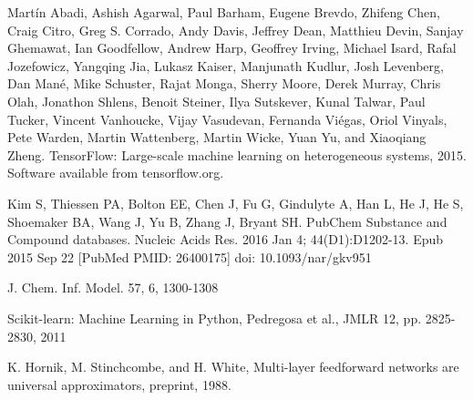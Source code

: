 \begin{thebibliography}{9}

		Martín Abadi, Ashish Agarwal, Paul Barham, Eugene Brevdo,
Zhifeng Chen, Craig Citro, Greg S. Corrado, Andy Davis,
Jeffrey Dean, Matthieu Devin, Sanjay Ghemawat, Ian Goodfellow,
Andrew Harp, Geoffrey Irving, Michael Isard, Rafal Jozefowicz, Yangqing Jia,
Lukasz Kaiser, Manjunath Kudlur, Josh Levenberg, Dan Mané, Mike Schuster,
Rajat Monga, Sherry Moore, Derek Murray, Chris Olah, Jonathon Shlens,
Benoit Steiner, Ilya Sutskever, Kunal Talwar, Paul Tucker,
Vincent Vanhoucke, Vijay Vasudevan, Fernanda Viégas,
Oriol Vinyals, Pete Warden, Martin Wattenberg, Martin Wicke,
Yuan Yu, and Xiaoqiang Zheng.
TensorFlow: Large-scale machine learning on heterogeneous systems,
2015. Software available from tensorflow.org.

		Kim S, Thiessen PA, Bolton EE, Chen J, Fu G, Gindulyte A, Han L, He J, He S, Shoemaker BA, Wang J, Yu B, Zhang J, Bryant SH. PubChem Substance and Compound databases. Nucleic Acids Res. 2016 Jan 4; 44(D1):D1202-13. Epub 2015 Sep 22 [PubMed PMID: 26400175] doi: 10.1093/nar/gkv951
		
		J. Chem. Inf. Model.  57, 6, 1300-1308

		Scikit-learn: Machine Learning in Python, Pedregosa et al., JMLR 12, pp. 2825-2830, 2011

		K. Hornik, M. Stinchcombe, and H. White, Multi-layer feedforward networks are universal 	approximators, preprint, 1988. 
	
          
\end{thebibliography}